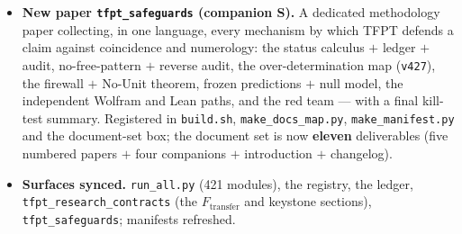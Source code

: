\documentclass[11pt]{article}
\begin{document}
\begin{itemize}
\item \textbf{New paper \texttt{tfpt\_safeguards} (companion S).} A dedicated methodology paper collecting,
in one language, every mechanism by which TFPT defends a claim against coincidence and numerology: the
status calculus $+$ ledger $+$ audit, no-free-pattern $+$ reverse audit, the over-determination map
(\texttt{v427}), the firewall $+$ No-Unit theorem, frozen predictions $+$ null model, the independent
Wolfram and Lean paths, and the red team --- with a final kill-test summary. Registered in
\texttt{build.sh}, \texttt{make\_docs\_map.py}, \texttt{make\_manifest.py} and the document-set box; the
document set is now \textbf{eleven} deliverables (five numbered papers $+$ four companions $+$ introduction
$+$ changelog).
\item \textbf{Surfaces synced.} \texttt{run\_all.py} (421 modules), the registry, the ledger,
\texttt{tfpt\_research\_contracts} (the $F_{\mathrm{transfer}}$ and keystone sections),
\texttt{tfpt\_safeguards}; manifests refreshed.
\end{itemize}
\end{document}
